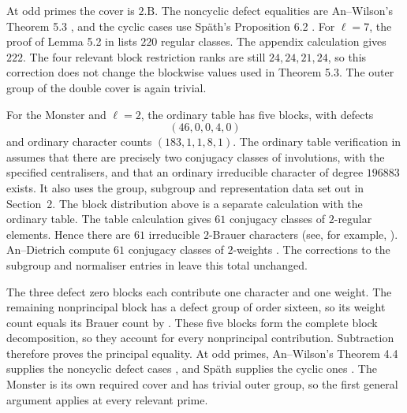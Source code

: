 At odd primes the cover is $2.\mathrm B$. The noncyclic defect equalities
are An--Wilson's Theorem 5.3 \cite{AnWilsonBaby}, and the cyclic cases use
Sp\"ath's Proposition 6.2 \cite{Spath2013}. For $\ell=7$, the proof of Lemma 5.2
in \cite{AnWilsonBaby} lists $220$ regular classes. The appendix calculation
gives $222$. The four relevant block restriction ranks are still
$24,24,21,24$, so this correction does not change the blockwise values used
in Theorem 5.3. The outer group of the double cover is again trivial.

For the Monster and $\ell=2$, the ordinary table has five blocks,
with defects
\[
 (46,0,0,4,0)
\]
and ordinary character counts $(183,1,1,8,1)$.
The ordinary table verification in
\cite[Sections~2 and 5]{BreuerMagaardWilsonMonster2026} assumes that there
are precisely two conjugacy classes of involutions, with the specified
centralisers, and that an ordinary irreducible character of degree $196883$
exists.
It also uses the group, subgroup and representation data set out in
Section~2. The block distribution above is a separate calculation with
the ordinary table.
The table calculation gives $61$ conjugacy classes of $2$-regular
elements. Hence there are $61$ irreducible $2$-Brauer characters
(see, for example, \cite[Corollary~2.10]{Navarro1998}).
An--Dietrich compute $61$ conjugacy classes of $2$-weights
\cite[proof of Theorem~4.2 and Table~17]{AnDietrich2012}.
The corrections to the subgroup and normaliser entries in
\cite[Table~17]{AnDietrichErratum} leave this total unchanged.

The three defect zero blocks each contribute one character and one weight.
The remaining nonprincipal block has a defect group of order sixteen,
so its weight count equals its Brauer count by
\cite[Theorem~13.7]{Sambale2014}. These five blocks form the complete
block decomposition, so they account for every nonprincipal contribution.
Subtraction therefore proves the principal equality. At odd primes,
An--Wilson's Theorem 4.4 supplies the noncyclic defect cases
\cite{AnWilsonMonster}, and Sp\"ath supplies the cyclic ones
\cite[Proposition~6.2]{Spath2013}. The Monster is its own required cover and
has trivial outer group, so the first general argument applies at every
relevant prime.

